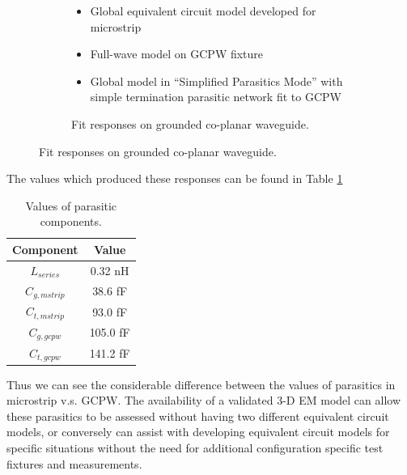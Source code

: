 \documentclass[12pt]{usfcoe}
\begin{document}
\begin{figure}
\begin{subfigure}{\textwidth}
            \vspace{-\topsep}
            \begin{itemize}
                \centering
                \setlength{\parskip}{0pt}
                \setlength{\itemsep}{0pt} 
                \color{blue}
                \item Global equivalent circuit model developed for microstrip
                \color{red}
                \item Full-wave model on GCPW fixture
                \color{green}
                \item Global model in ``Simplified Parasitics Mode'' with simple termination parasitic network fit to GCPW
            \end{itemize}
            \vspace*{-9pt}
                    \caption{Fit responses on grounded co-planar waveguide.}
                    \label{fig:mstrip_gcpw_comparisonb}
                \end{subfigure}
		\end{figure}
		
		The values which produced these responses can be found in Table
		\ref{tbl:mstrip_gcpw_final values}
		
		\begin{table}[H]
		\centering
		\begin{tabular}{|c|c|}
			\hline
			  Component & Value \\
			 \hline
			 $L_{series}$ & 0.32 nH \\
			 \hline
			 $C_{g,mstrip}$ & 38.6 fF \\
			 \hline
			 $C_{t,mstrip}$ & 93.0 fF \\
			 \hline
			 $C_{g,gcpw}$ & 105.0 fF \\
			 \hline
			 $C_{t,gcpw}$ & 141.2 fF \\
			 \hline
		\end{tabular}
		\caption{Values of parasitic components.}
		\label{tbl:mstrip_gcpw_final values}
		\end{table}
		
			Thus we can see the considerable difference between the values of 
			parasitics in microstrip v.s. GCPW.  The availability of a validated 3-D EM model can allow these parasitics to be assessed without having two different equivalent circuit models, or conversely can assist with developing equivalent circuit models for specific situations without the need for additional configuration specific test fixtures and measurements. 
		
\end{document}
